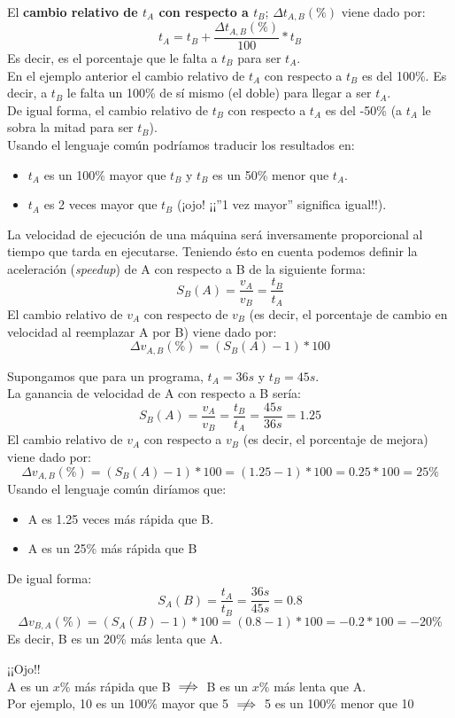 \documentclass[12pt,spanish]{article}
\begin{document}
El \textbf{cambio relativo de $t_A$ con respecto a $t_B$}; $\Delta t_{A,B}(\%)$ viene dado por:
\[
t_A=t_B + \frac{\Delta t_{A,B}(\%)}{100} * t_B
\]
Es decir, es el porcentaje que le falta a $t_B$ para ser $t_A$.\\
En el ejemplo anterior el cambio relativo de $t_A$ con respecto a $t_B$ es del 100\%. Es decir, a $t_B$ le falta un 100\% de sí mismo (el doble) para llegar a ser $t_A$.\\
De igual forma, el cambio relativo de $t_B$ con respecto a $t_A$ es del -50\% (a $t_A$ le sobra la mitad para ser $t_B$).\\
Usando el lenguaje común podríamos traducir los resultados en:
\begin{itemize}
	\item $t_A$ es un 100\% mayor que $t_B$ y $t_B$ es un 50\% menor que $t_A$.
	\item $t_A$ es 2 veces mayor que $t_B$ (¡ojo! ¡¡''1 vez mayor'' significa igual!!).
\end{itemize}

La velocidad de ejecución de una máquina será inversamente proporcional al tiempo que tarda en ejecutarse. Teniendo ésto en cuenta podemos definir la aceleración (\textit{speedup}) de A con respecto a B de la siguiente forma:
\[
S_B(A)=\frac{v_A}{v_B}=\frac{t_B}{t_A}
\]
El cambio relativo de $v_A$ con respecto de $v_B$ (es decir, el porcentaje de cambio en velocidad al reemplazar A por B) viene dado por:
\[
\Delta v_{A,B}(\%)=(S_B(A) -1) * 100
\]

Supongamos que para un programa, $t_A=36s$ y $t_B=45s$.\\
La ganancia de velocidad de A con respecto a B sería:
\[
S_B(A)=\frac{v_A}{v_B}=\frac{t_B}{t_A}=\frac{45 s}{36 s}=1.25
\]
El cambio relativo de $v_A$ con respecto a $v_B$ (es decir, el porcentaje de mejora) viene dado por:
\[
\Delta v_{A,B}(\%)=(S_B(A)-1) * 100 = (1.25 - 1) * 100 = 0.25 * 100 = 25\%
\]
Usando el lenguaje común diríamos que:
\begin{itemize}
	\item A es 1.25 veces más rápida que B.
	\item A es un 25\% más rápida que B
\end{itemize}
De igual forma:
\[
S_A(B)=\frac{t_A}{t_B}=\frac{36 s}{45 s}=0.8
\]
\[
\Delta v_{B,A}(\%)=(S_A(B)-1) * 100 = (0.8 - 1) * 100 = -0.2 * 100 = -20\%
\]
Es decir, B es un 20\% más lenta que A.

\begin{center}
	¡¡Ojo!! \\
	A es un $x\%$ más rápida que B $\centernot\implies$ B es un $x\%$ más lenta que A.\\
	Por ejemplo, 10 es un 100\% mayor que 5 $\centernot\implies$ 5 es un 100\% menor que 10
\end{center}
\end{document}

